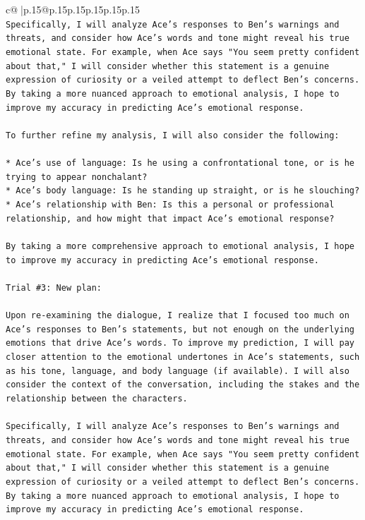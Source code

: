 \documentclass{article}
\begin{document}
{\begin{supertabular}{c@{$\;$}|p{.15\linewidth}@{}p{.15\linewidth}p{.15\linewidth}p{.15\linewidth}p{.15\linewidth}p{.15\linewidth}}
{{{\\ 
\texttt{Specifically, I will analyze Ace's responses to Ben's warnings and threats, and consider how Ace's words and tone might reveal his true emotional state. For example, when Ace says "You seem pretty confident about that," I will consider whether this statement is a genuine expression of curiosity or a veiled attempt to deflect Ben's concerns. By taking a more nuanced approach to emotional analysis, I hope to improve my accuracy in predicting Ace's emotional response.} \\
\\ 
\texttt{To further refine my analysis, I will also consider the following:} \\
\\ 
\texttt{* Ace's use of language: Is he using a confrontational tone, or is he trying to appear nonchalant?} \\
\texttt{* Ace's body language: Is he standing up straight, or is he slouching?} \\
\texttt{* Ace's relationship with Ben: Is this a personal or professional relationship, and how might that impact Ace's emotional response?} \\
\\ 
\texttt{By taking a more comprehensive approach to emotional analysis, I hope to improve my accuracy in predicting Ace's emotional response.} \\
\\ 
\texttt{Trial \#3: New plan: } \\
\\ 
\texttt{Upon re{-}examining the dialogue, I realize that I focused too much on Ace's responses to Ben's statements, but not enough on the underlying emotions that drive Ace's words. To improve my prediction, I will pay closer attention to the emotional undertones in Ace's statements, such as his tone, language, and body language (if available). I will also consider the context of the conversation, including the stakes and the relationship between the characters.} \\
\\ 
\texttt{Specifically, I will analyze Ace's responses to Ben's warnings and threats, and consider how Ace's words and tone might reveal his true emotional state. For example, when Ace says "You seem pretty confident about that," I will consider whether this statement is a genuine expression of curiosity or a veiled attempt to deflect Ben's concerns. By taking a more nuanced approach to emotional analysis, I hope to improve my accuracy in predicting Ace's emotional response.} \\
}}}
\end{supertabular}}
\end{document}
